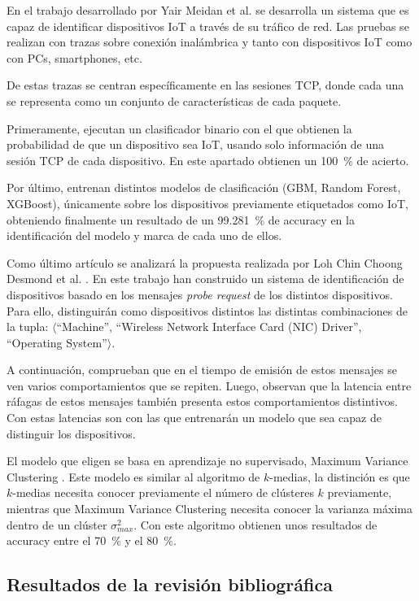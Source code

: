 En el trabajo desarrollado por Yair Meidan et al. \cite{meidan2017profiliot} se desarrolla un sistema que es capaz de identificar dispositivos IoT a través de su tráfico de red. Las pruebas se realizan con trazas sobre conexión inalámbrica y tanto con dispositivos IoT como con PCs, smartphones, etc. 

De estas trazas se centran específicamente en las sesiones TCP, donde cada una se representa como un conjunto de características de cada paquete.

Primeramente, ejecutan un clasificador binario con el que obtienen la probabilidad de que un dispositivo sea IoT, usando solo información de una sesión TCP de cada dispositivo. En este apartado obtienen un \SI{100}{\percent} de acierto.

Por último, entrenan distintos modelos de clasificación (GBM, Random Forest, XGBoost), únicamente sobre los dispositivos previamente etiquetados como IoT, obteniendo finalmente un resultado de un \SI{99.281}{\percent} de accuracy en la identificación del modelo y marca de cada uno de ellos.

Como último artículo se analizará la propuesta realizada por Loh Chin Choong Desmond et al. \cite{desmond2008identifying}. En este trabajo han construido un sistema de identificación de dispositivos basado en los mensajes \textit{probe request} de los distintos dispositivos. Para ello, distinguirán como dispositivos distintos las distintas combinaciones de la tupla: $\langle$``Machine'', ``Wireless Network Interface Card (NIC) Driver'', ``Operating System''$\rangle$.

A continuación, comprueban que en el tiempo de emisión de estos mensajes se ven varios comportamientos que se repiten. Luego, observan que la latencia entre ráfagas de estos mensajes también presenta estos comportamientos distintivos. Con estas latencias son con las que entrenarán un modelo que sea capaz de distinguir los dispositivos.

El modelo que eligen se basa en aprendizaje no supervisado, Maximum Variance Clustering \cite{veenman2002maximum}. Este modelo es similar al algoritmo de $k$-medias, la distinción es que $k$-medias necesita conocer previamente el número de clústeres $k$ previamente, mientras que Maximum Variance Clustering necesita conocer la varianza máxima dentro de un clúster $\sigma^2_{max}$. Con este algoritmo obtienen unos resultados de accuracy entre el \SI{70}{\percent} y el \SI{80}{\percent}.


\subsection{Resultados de la revisión bibliográfica}

